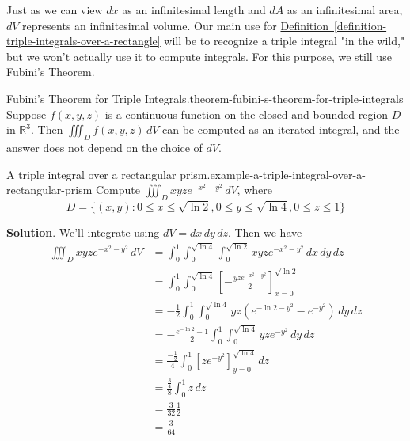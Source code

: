 \documentclass[10pt,]{book}
\numberwithin{equation}{section}
\newcommand{\RR}{\mathbb{R}}
\begin{document}
 Just as we can view \(dx\) as an infinitesimal length and \(dA\) as an infinitesimal area, \(dV\) represents an infinitesimal volume.%
Our main use for \hyperref[definition-triple-integrals-over-a-rectangle]{Definition~\ref{definition-triple-integrals-over-a-rectangle}} will be to recognize a triple integral "in the wild," but we won't actually use it to compute integrals. For this purpose, we still use Fubini's Theorem.\begin{theorem}{Fubini's Theorem for Triple Integrals.}{}{theorem-fubini-s-theorem-for-triple-integrals}%
\hypertarget{p-1507}{}%
Suppose \(f(x,y,z)\) is a continuous function on the closed and bounded region \(D\) in \(\RR^{3}\). Then \(\iiint_{D}f(x,y,z)\,dV\) can be computed as an iterated integral, and the answer does not depend on the choice of \(dV\).%
\end{theorem}
\begin{example}{A triple integral over a rectangular prism.}{example-a-triple-integral-over-a-rectangular-prism}%
\hypertarget{p-1508}{}%
Compute \(\iiint_{D}xyze^{-x^{2} - y^{2}}\,dV\), where%
\begin{equation*}
D = \{(x,y) : 0\leq x\leq\sqrt{\ln2}, 0\leq y\leq\sqrt{\ln4}, 0\leq z\leq 1\}
\end{equation*}
%
\par\smallskip%
\noindent\textbf{Solution}.\hypertarget{solution-248}{}\quad%
\hypertarget{p-1509}{}%
We'll integrate using \(dV = dx\,dy\,dz\). Then we have%
\begin{align*}
\iiint_{D}xyze^{-x^{2} - y^{2}}\,dV & = \int_{0}^{1}\int_{0}^{\sqrt{\ln4}}\int_{0}^{\sqrt{\ln2}} xyze^{-x^{2} - y^{2}}\,dx\,dy\,dz \\
& = \int_{0}^{1}\int_{0}^{\sqrt{\ln4}}\left[-\frac{yze^{-x^{2} - y^{2}}}{2}\right]_{x=0}^{\sqrt{\ln2}} \\
& = -\frac{1}{2}\int_{0}^{1}\int_{0}^{\sqrt{\ln4}} yz(e^{-\ln2 - y^{2}} - e^{-y^{2}})\,dy\,dz \\
& = -\frac{e^{-\ln2} - 1}{2}\int_{0}^{1}\int_{0}^{\sqrt{\ln4}} yze^{-y^{2}}\,dy\,dz \\
& = \frac{-\frac{1}{2}}{4}\int_{0}^{1}\left[ze^{-y^{2}}\right]_{y=0}^{\sqrt{\ln4}}\,dz \\
& = \frac{\frac{3}{4}}{8}\int_{0}^{1}z\,dz \\
& = \frac{3}{32}\frac{1}{2} \\
& = \frac{3}{64} 
\end{align*}
%
\end{example}
\end{document}
